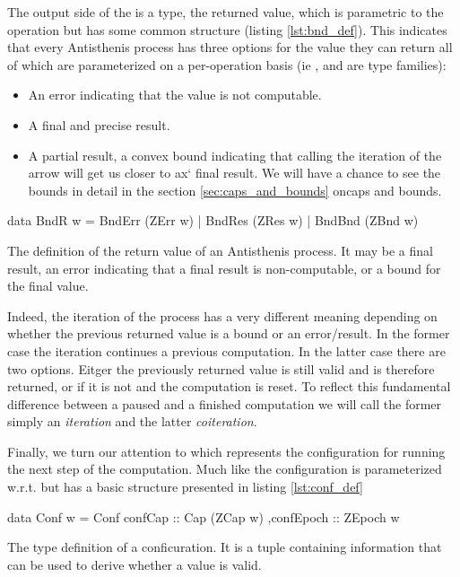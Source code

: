 The output side of the  is a  type, the
returned value, which is parametric to the operation but has some
common structure (listing \ref{lst:bnd_def}). This indicates that every
Antisthenis process has three options for the value they can return
all of which are parameterized on a per-operation basis (ie
,  and  are type families):


\begin{itemize}
\item An error indicating that the value is not computable.
\item A final and precise result.
\item A partial result, a convex bound indicating that calling the
  iteration of the arrow will get us closer to ax` final result. We will
  have a chance to see the bounds in detail in the section
  \ref{sec:caps_and_bounds} oncaps and bounds.
\end{itemize}


\begin{code}
\begin{haskellcode}
data BndR w
  = BndErr (ZErr w)
  | BndRes (ZRes w)
  | BndBnd (ZBnd w)
\end{haskellcode}
\label{lst:bnd_def}
\caption{The definition of the return value of an Antisthenis
  process. It may be a final result, an error indicating that a final
  result is non-computable, or a bound for the final value.}
\end{code}

Indeed, the iteration of the process has a very different meaning
depending on whether the previous returned value is a bound or an
error/result. In the former case the iteration continues a previous
computation. In the latter case there are two options. Eitger the
previously returned value is still valid and is therefore returned, or
if it is not and the computation is reset. To reflect this fundamental
difference between a paused and a finished computation we will call
the former simply an \emph{iteration} and the latter \emph{coiteration}.

Finally, we turn our attention to  which represents the
configuration for running the next step of the computation. Much like
 the configuration is parameterized w.r.t.  but has
a basic structure presented in listing \ref{lst:conf_def}

\begin{code}
\begin{haskellcode}
data Conf w =
  Conf { confCap :: Cap (ZCap w)
        ,confEpoch :: ZEpoch w
       }
\end{haskellcode}
\label{lst:conf_def}
\caption{The type definition of a conficuration. It is a tuple
  containing information that can be used to derive whether a value is
  valid.}
\end{code}

